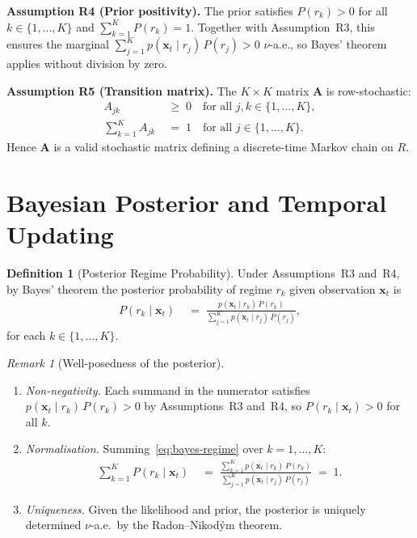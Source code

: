 \documentclass[12pt,openany]{book}
\newcommand{\bfx}{\mathbf{x}}
\numberwithin{equation}{chapter}
\theoremstyle{plain}
\theoremstyle{definition}
\newtheorem{definition}[theorem]{Definition}
\theoremstyle{remark}
\newtheorem{remark}[theorem]{Remark}
\numberwithin{equation}{chapter}
\theoremstyle{plain}
\newcommand{\calR}{\mathcal{R}}
\newcommand{\bfA}{\mathbf{A}}
\def\calR{R}%
\begin{document}
\medskip
\noindent\textbf{Assumption R4 (Prior positivity).}
The prior satisfies $P(r_k) > 0$ for all $k \in \{1,\ldots,K\}$
and $\sum_{k=1}^{K} P(r_k) = 1$.  Together with
Assumption~R3, this ensures the marginal
$\sum_{j=1}^{K} p(\bfx_t \mid r_j)\,P(r_j) > 0$
$\nu$-a.e., so Bayes' theorem applies without division by zero.

\medskip
\noindent\textbf{Assumption R5 (Transition matrix).}
The $K \times K$ matrix $\bfA$ is row-stochastic:
\begin{align}
  A_{jk} &\;\geq\; 0
  \quad \text{for all } j, k \in \{1,\ldots,K\},
  \label{eq:A-nonneg} \\
  \sum_{k=1}^{K} A_{jk} &\;=\; 1
  \quad \text{for all } j \in \{1,\ldots,K\}.
  \label{eq:A-rowsum}
\end{align}
Hence $\bfA$ is a valid stochastic matrix defining a
discrete-time Markov chain on $\calR$.

\section{Bayesian Posterior and Temporal Updating}

\begin{definition}[Posterior Regime Probability]
\label{def:posterior-regime}
Under Assumptions~R3 and~R4, by Bayes' theorem the posterior
probability of regime $r_k$ given observation $\bfx_t$ is
\begin{align}
  P(r_k \mid \bfx_t)
  &\;=\;
  \frac{p(\bfx_t \mid r_k)\,P(r_k)}
       {\displaystyle\sum_{j=1}^{K} p(\bfx_t \mid r_j)\,P(r_j)},
  \label{eq:bayes-regime}
\end{align}
for each $k \in \{1,\ldots,K\}$.
\end{definition}

\begin{remark}[Well-posedness of the posterior]
\label{rem:bayes-wellposed}
\begin{enumerate}
  \item \emph{Non-negativity.}  Each summand in the numerator
        satisfies $p(\bfx_t \mid r_k)\,P(r_k) > 0$ by
        Assumptions~R3 and~R4, so $P(r_k \mid \bfx_t) > 0$
        for all $k$.
  \item \emph{Normalisation.}  Summing~\eqref{eq:bayes-regime}
        over $k = 1, \ldots, K$:
        \begin{align}
          \sum_{k=1}^{K} P(r_k \mid \bfx_t)
          &\;=\;
          \frac{\displaystyle\sum_{k=1}^{K}
                p(\bfx_t \mid r_k)\,P(r_k)}
               {\displaystyle\sum_{j=1}^{K}
                p(\bfx_t \mid r_j)\,P(r_j)}
          \;=\; 1.
          \label{eq:posterior-norm}
        \end{align}
  \item \emph{Uniqueness.}  Given the likelihood and prior,
        the posterior is uniquely determined $\nu$-a.e.\ by
        the Radon--Nikod\'ym theorem.
\end{enumerate}
\end{remark}
\end{document}

